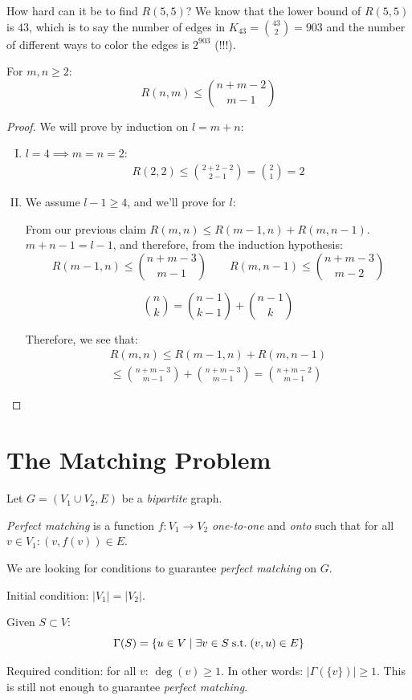 \documentclass[00_complete]{subfiles}
\begin{document}
How hard can it be to find $R(5,5)$?
We know that the lower bound of $R(5,5)$ is $43$, which is to say the number of
edges in $K_{43}=\binom{43}{2}=903$ and the number of different ways to color
the edges is $2^{903}$ (!!!).
\begin{theorem}
    For $m,n\geq 2$:
    $$R(n,m) \leq \binom{n+m-2}{m-1}$$
\end{theorem}
\begin{proof}
    We will prove by induction on $l=m+n$:
    \begin{enumerate}[I.]
        \item $l=4 \implies m=n=2$:
        \begin{gather*}
           R(2,2)\leq\binom{2+2-2}{2-1}=\binom{2}{1}=2
           \tag{\checkmark}
        \end{gather*}
        \item We assume $l-1\geq 4$, and we'll prove for $l$:

        From our previous claim $R(m,n)\leq R(m-1,n)+R(m,n-1)$. $m+n-1=l-1$,
        and therefore, from the induction hypothesis:
        $$R(m-1,n)\leq\binom{n+m-3}{m-1} \qquad
        R(m,n-1)\leq\binom{n+m-3}{m-2}$$
        \begin{reminder}
            $$\binom{n}{k}=\binom{n-1}{k-1}+\binom{n-1}{k}$$
        \end{reminder}
        Therefore, we see that:
        \begin{gather*}
        R(m,n)\leq R(m-1,n)+R(m,n-1) \\ \leq\binom{n+m-3}{m-1}+\binom{n+m-3}{m-1}
        =\binom{n+m-2}{m-1} \tag{\checkmark}
        \end{gather*}
    \end{enumerate}
\end{proof}
\section{The Matching Problem}
    Let $G=(V_1\cup V_2,E)$ be a \emph{bipartite} graph.
    \begin{definition}
        \emph{Perfect matching} is a function $f:V_1\to V_2$ \emph{one-to-one}
        and \emph{onto} such that for all $v \in V_1: (v,f(v)) \in E$.
    \end{definition}
    We are looking for conditions to guarantee \emph{perfect matching} on $G$.

    Initial condition: $|V_1|=|V_2|$.
    \begin{definition}[Neighbors]
        Given $S \subset V$:
        $$\Gamma(S)=\{u \in V \mid \exists v \in S \;\mathrm{s.t.}\; (v,u) \in E\}$$
    \end{definition}
    Required condition: for all $v$: $\deg(v)\geq 1$. In other words:
    $|\Gamma(\{v\})|\geq1$. This is still not enough to guarantee \emph{perfect
    matching}.
\end{document}
